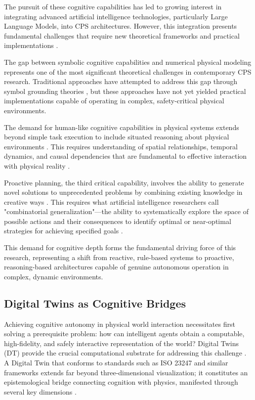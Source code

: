 The pursuit of these cognitive capabilities has led to growing interest in integrating advanced artificial intelligence technologies, particularly Large Language Models, into CPS architectures. However, this integration presents fundamental challenges that require new theoretical frameworks and practical implementations \cite{chen2020cognitive, zhang2021cognitive}.

The gap between symbolic cognitive capabilities and numerical physical modeling represents one of the most significant theoretical challenges in contemporary CPS research. Traditional approaches have attempted to address this gap through symbol grounding theories \cite{harnad1990symbol, barsalou2008grounded}, but these approaches have not yet yielded practical implementations capable of operating in complex, safety-critical physical environments.

The demand for human-like cognitive capabilities in physical systems extends beyond simple task execution to include situated reasoning about physical environments \cite{lake2017building, marcus2020next}. This requires understanding of spatial relationships, temporal dynamics, and causal dependencies that are fundamental to effective interaction with physical reality \cite{smith1987situated, suchman1987plans}.

Proactive planning, the third critical capability, involves the ability to generate novel solutions to unprecedented problems by combining existing knowledge in creative ways \cite{hayes1985naive, davis1990representation}. This requires what artificial intelligence researchers call "combinatorial generalization"—the ability to systematically explore the space of possible actions and their consequences to identify optimal or near-optimal strategies for achieving specified goals \cite{lake2018generalization, fodor1988connectionism}.

This demand for cognitive depth forms the fundamental driving force of this research, representing a shift from reactive, rule-based systems to proactive, reasoning-based architectures capable of genuine autonomous operation in complex, dynamic environments.

\subsection{Digital Twins as Cognitive Bridges}

Achieving cognitive autonomy in physical world interaction necessitates first solving a prerequisite problem: how can intelligent agents obtain a computable, high-fidelity, and safely interactive representation of the world? Digital Twins (DT) provide the crucial computational substrate for addressing this challenge \cite{grieves2014digital, tao2019digital}. A Digital Twin that conforms to standards such as ISO 23247 and similar frameworks extends far beyond three-dimensional visualization; it constitutes an epistemological bridge connecting cognition with physics, manifested through several key dimensions \cite{ISO23247, jones2020characterising}.

